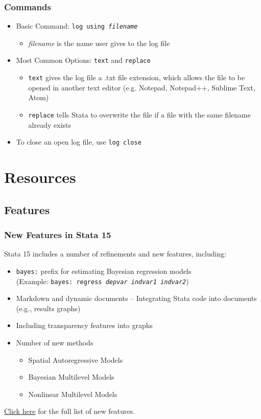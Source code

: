 \documentclass{beamer}
\begin{document}
\begin{frame}
	\frametitle{Commands}
		\begin{itemize}
			\item Basic Command: \texttt{log using \textit{filename}}
				\begin{itemize}
					\item \textit{filename} is the name user gives to the log file
				\end{itemize}
			\item Most Common Options: \texttt{text} and \texttt{replace}
				\begin{itemize}
					\item \texttt{text} gives the log file a .txt file extension, which allows the file to be opened in another text editor (e.g. Notepad, Notepad++, Sublime Text, Atom)
					\item \texttt{replace} tells Stata to overwrite the file if a file with the same filename already exists
				\end{itemize}
			\item To close an open log file, use \texttt{log close}
		\end{itemize}
\end{frame}

\section{Resources}
\subsection{Features}

\begin{frame}
	\frametitle{New Features in Stata 15}
		Stata 15 includes a number of refinements and new features, including:
			\begin{itemize}
				\item \texttt{bayes:} prefix for estimating Bayesian regression models \\(Example: \texttt{bayes:~regress \textit{depvar} \textit{indvar1} \textit{indvar2}})
				\item Markdown and dynamic documents -- Integrating Stata code into documents (e.g., results graphs)
				\item Including transparency features into graphs
				\item Number of new methods
					\begin{itemize}
						\item Spatial Autoregressive Models
						\item Bayesian Multilevel Models
						\item Nonlinear Multilevel Models
					\end{itemize}
			\end{itemize}
		\href{https://www.stata.com/new-in-stata/}{Click here} for the full list of new features.
\end{frame}
\end{document}
